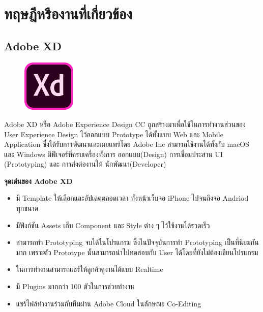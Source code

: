 \chapter{ทฤษฎีหรืองานที่เกี่ยวข้อง}
\label{chapter2}

\section{Adobe XD}
\label{Adobe XD}
\begin{figure}[!thb]
	\captionsetup{justification=centering}
	\centering
	\includegraphics[width=1in]{latex/figures/adobexd.png}
	\label{fig:adobexd}
\end{figure}
Adobe XD หรือ Adobe Experience Design CC ถูกสร้างมาเพื่อใช้ในการทำงานส่วนของ User Experience Design ไว้ออกแบบ Prototype ได้ทั้งแบบ  Web และ Mobile Application ซึ่งได้รับการพัฒนาและเผยแพร่โดย Adobe Inc สามารถใช้งานได้ทั้งกับ macOS และ Windows มีฟีเจอร์ที่ครบเครื่องทั้งการ ออกแบบ(Design) การเชื่อมประสาน UI (Prototyping) และ การส่งต่องานให้ นักพัฒนา(Developer)
\begin{flushleft}
		\textbf{จุดเด่นของ Adobe XD}
\end{flushleft}
\begin{itemize}
    \item มี Template ให้เลือกและอัปเดตตลอดเวลา ทั้งหน้าเว็บจอ iPhone ไปจนถึงจอ Andriod ทุกขนาด
    \item มีฟังก์ชัน Assets เก็บ Component และ Style ต่าง ๆ ไว้ใช้งานได้รวดเร็ว
    \item สามารถทำ Prototyping จบได้ในโปรแกรม ซึ่งในปัจจุบันการทำ Prototyping เป็นที่นิยมกันมาก เพราะตัว Prototype นั้นสามารถนำไปทดสอบกับ User ได้โดยที่ยังไม่ต้องเขียนโปรแกรม
    \item ในการทำงานสามารถแชร์ให้ลูกค้าดูงานได้แบบ Realtime
    \item มี Plugins มากกว่า 100 ตัวในการช่วยทำงาน
    \item แชร์ไฟล์ทำงานร่วมกับทีมผ่าน Adobe Cloud ในลักษณะ Co-Editing
\end{itemize}
\newpage

